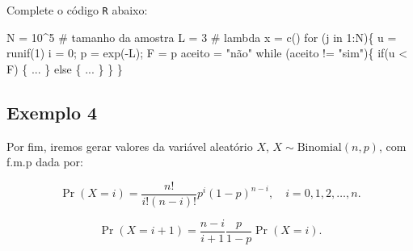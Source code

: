 \documentclass[
  letterpaper,
  DIV=11,
  numbers=noendperiod]{scrreprt}
\newenvironment{Shaded}{\begin{snugshade}}{\end{snugshade}}
\newcommand{\CommentTok}[1]{\textcolor[rgb]{0.37,0.37,0.37}{#1}}
\newcommand{\ControlFlowTok}[1]{\textcolor[rgb]{0.00,0.23,0.31}{#1}}
\newcommand{\DecValTok}[1]{\textcolor[rgb]{0.68,0.00,0.00}{#1}}
\newcommand{\FunctionTok}[1]{\textcolor[rgb]{0.28,0.35,0.67}{#1}}
\newcommand{\NormalTok}[1]{\textcolor[rgb]{0.00,0.23,0.31}{#1}}
\newcommand{\OtherTok}[1]{\textcolor[rgb]{0.00,0.23,0.31}{#1}}
\newcommand{\SpecialCharTok}[1]{\textcolor[rgb]{0.37,0.37,0.37}{#1}}
\newcommand{\StringTok}[1]{\textcolor[rgb]{0.13,0.47,0.30}{#1}}
\begin{document}
Complete o código \texttt{R} abaixo:

\begin{Shaded}
\begin{Highlighting}[]
\NormalTok{N }\OtherTok{=} \DecValTok{10}\SpecialCharTok{\^{}}\DecValTok{5} \CommentTok{\# tamanho da amostra}
\NormalTok{L }\OtherTok{=} \DecValTok{3}  \CommentTok{\# lambda}
\NormalTok{x }\OtherTok{=} \FunctionTok{c}\NormalTok{()}
\ControlFlowTok{for}\NormalTok{ (j }\ControlFlowTok{in} \DecValTok{1}\SpecialCharTok{:}\NormalTok{N)\{}
\NormalTok{  u }\OtherTok{=} \FunctionTok{runif}\NormalTok{(}\DecValTok{1}\NormalTok{)}
\NormalTok{  i }\OtherTok{=} \DecValTok{0}\NormalTok{; p }\OtherTok{=} \FunctionTok{exp}\NormalTok{(}\SpecialCharTok{{-}}\NormalTok{L); F }\OtherTok{=}\NormalTok{ p}
\NormalTok{  aceito }\OtherTok{=} \StringTok{"não"}
  \ControlFlowTok{while}\NormalTok{ (aceito }\SpecialCharTok{!=} \StringTok{"sim"}\NormalTok{)\{}
    \ControlFlowTok{if}\NormalTok{(u }\SpecialCharTok{\textless{}}\NormalTok{ F) \{}
\NormalTok{       ...}
\NormalTok{     \} }\ControlFlowTok{else}\NormalTok{ \{}
\NormalTok{        ...}
\NormalTok{      \}}
\NormalTok{  \}}
\NormalTok{\}}
\end{Highlighting}
\end{Shaded}

\subsection*{Exemplo 4}\label{exemplo-4}

Por fim, iremos gerar valores da variável aleatório \(X\),
\(X\sim \mbox{Binomial}(n,p)\), com f.m.p dada por:

\[\Pr(X=i)=\dfrac{n!}{i!(n-i)!}p^i(1-p)^{n-i}, \quad i=0,1,2,\ldots,n.\]

\begin{tcolorbox}[enhanced jigsaw, left=2mm, toprule=.15mm, opacityback=0, title=\textcolor{quarto-callout-important-color}{\faExclamation}\hspace{0.5em}{Identidade importante:}, leftrule=.75mm, breakable, colbacktitle=quarto-callout-important-color!10!white, coltitle=black, rightrule=.15mm, bottomtitle=1mm, toptitle=1mm, colframe=quarto-callout-important-color-frame, colback=white, opacitybacktitle=0.6, bottomrule=.15mm, arc=.35mm, titlerule=0mm]

\[\Pr(X=i+1) = \dfrac{n-i}{i+1}\dfrac{p}{1-p}\Pr(X=i).\]

\end{tcolorbox}
\end{document}
